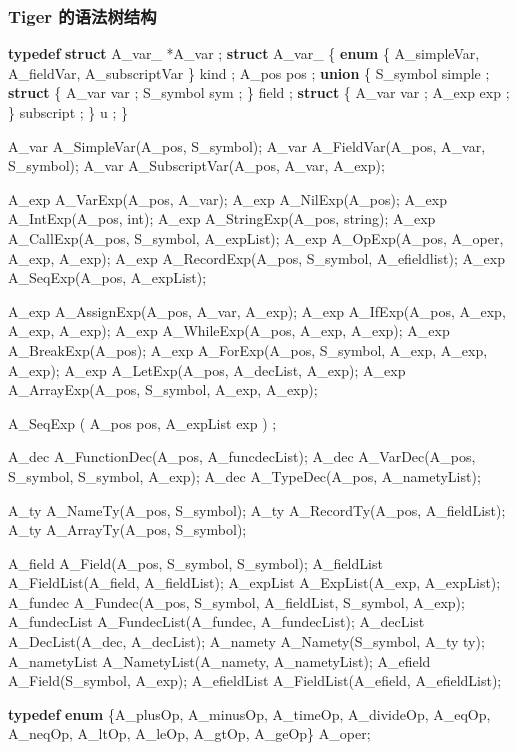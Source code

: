 \documentclass[
]{article}
\newenvironment{Shaded}{}{}
\newcommand{\DataTypeTok}[1]{\textcolor[rgb]{0.56,0.13,0.00}{#1}}
\newcommand{\KeywordTok}[1]{\textcolor[rgb]{0.00,0.44,0.13}{\textbf{#1}}}
\newcommand{\NormalTok}[1]{#1}
\begin{document}
\hypertarget{header-n120}{%
\subsubsection{Tiger 的语法树结构}\label{header-n120}}

\begin{Shaded}
\begin{Highlighting}[]
 \KeywordTok{typedef} \KeywordTok{struct}\NormalTok{ A_var_ *A_var ;}
 \KeywordTok{struct}\NormalTok{ A_var_ \{}
	\KeywordTok{enum}\NormalTok{ \{ A_simpleVar, A_fieldVar, A_subscriptVar \} kind ;}
\NormalTok{	A_pos pos ;}
	\KeywordTok{union}\NormalTok{ \{}
\NormalTok{		S_symbol simple ;}
		\KeywordTok{struct}\NormalTok{ \{ A_var var ; S_symbol sym ; \} field ;}
		\KeywordTok{struct}\NormalTok{ \{ A_var var ; A_exp exp ; \} subscript ;}
\NormalTok{	\} u ;}
\NormalTok{ \}}
 
\NormalTok{A_var A_SimpleVar(A_pos, S_symbol);}
\NormalTok{A_var A_FieldVar(A_pos, A_var, S_symbol);}
\NormalTok{A_var A_SubscriptVar(A_pos, A_var, A_exp);}

\NormalTok{A_exp A_VarExp(A_pos, A_var);}
\NormalTok{A_exp A_NilExp(A_pos);}
\NormalTok{A_exp A_IntExp(A_pos, }\DataTypeTok{int}\NormalTok{);}
\NormalTok{A_exp A_StringExp(A_pos, string);}
\NormalTok{A_exp A_CallExp(A_pos, S_symbol, A_expList);}
\NormalTok{A_exp A_OpExp(A_pos, A_oper, A_exp, A_exp);}
\NormalTok{A_exp A_RecordExp(A_pos, S_symbol, A_efieldlist);}
\NormalTok{A_exp A_SeqExp(A_pos, A_expList);}

\NormalTok{A_exp A_AssignExp(A_pos, A_var, A_exp);}
\NormalTok{A_exp A_IfExp(A_pos, A_exp, A_exp, A_exp);}
\NormalTok{A_exp A_WhileExp(A_pos, A_exp, A_exp);}
\NormalTok{A_exp A_BreakExp(A_pos);}
\NormalTok{A_exp A_ForExp(A_pos, S_symbol, A_exp, A_exp, A_exp);}
\NormalTok{A_exp A_LetExp(A_pos, A_decList, A_exp);}
\NormalTok{A_exp A_ArrayExp(A_pos, S_symbol, A_exp, A_exp);}

\NormalTok{A_SeqExp ( A_pos pos, A_expList exp ) ; }

\NormalTok{A_dec A_FunctionDec(A_pos, A_funcdecList);}
\NormalTok{A_dec A_VarDec(A_pos, S_symbol, S_symbol, A_exp);}
\NormalTok{A_dec A_TypeDec(A_pos, A_nametyList);}

\NormalTok{A_ty A_NameTy(A_pos, S_symbol);}
\NormalTok{A_ty A_RecordTy(A_pos, A_fieldList);}
\NormalTok{A_ty A_ArrayTy(A_pos, S_symbol);}

\NormalTok{A_field A_Field(A_pos, S_symbol, S_symbol);}
\NormalTok{A_fieldList A_FieldList(A_field, A_fieldList);}
\NormalTok{A_expList A_ExpList(A_exp, A_expList);}
\NormalTok{A_fundec A_Fundec(A_pos, S_symbol, A_fieldList, S_symbol, A_exp);}
\NormalTok{A_fundecList A_FundecList(A_fundec, A_fundecList);}
\NormalTok{A_decList A_DecList(A_dec, A_decList);}
\NormalTok{A_namety A_Namety(S_symbol, A_ty ty);}
\NormalTok{A_nametyList A_NametyList(A_namety, A_nametyList);}
\NormalTok{A_efield A_Field(S_symbol, A_exp);}
\NormalTok{A_efieldList A_FieldList(A_efield, A_efieldList);}

\KeywordTok{typedef} \KeywordTok{enum}\NormalTok{ \{A_plusOp, A_minusOp, A_timeOp, A_divideOp, A_eqOp, A_neqOp, A_ltOp, A_leOp, A_gtOp, A_geOp\} A_oper;}
\end{Highlighting}
\end{Shaded}
\end{document}
